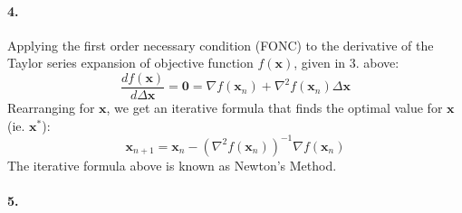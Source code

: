 \documentclass{article}
\begin{document}
\paragraph*{4.}
Applying the first order necessary condition (FONC) to the derivative of the Taylor series expansion of objective function $f(\mathbf{x})$, given in 3. above:
\begin{equation}
    \frac{df(\mathbf{x})}{d\Delta \mathbf{x}} = \mathbf{0} = \nabla f(\mathbf{x}_{n}) + \nabla^{2}f(\mathbf{x}_{n})\Delta \mathbf{x}
\end{equation}
Rearranging for $\mathbf{x}$, we get an iterative formula that finds the optimal value for $\mathbf{x}$ (ie. $\mathbf{x}^{*}$):
\begin{equation}
    \mathbf{x}_{n+1} = \mathbf{x}_{n} - (\nabla^{2}f(\mathbf{x}_{n}))^{-1}\nabla f(\mathbf{x}_{n})
\end{equation}
The iterative formula above is known as Newton's Method.



\paragraph*{5.}
\end{document}
